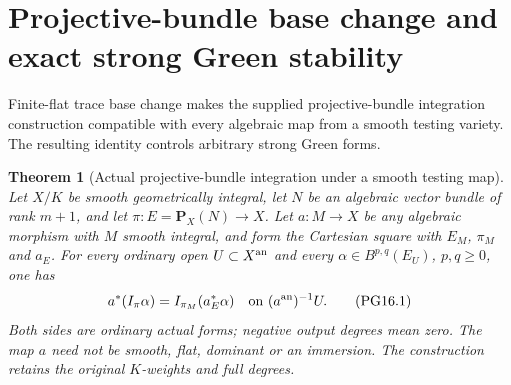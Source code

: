 \documentclass[11pt,a4paper]{article}
\newtheorem{theorem}{Theorem}[section]
\theoremstyle{definition}
\theoremstyle{remark}
\numberwithin{equation}{section}
\begin{document}
\section{Projective-bundle base change and exact strong Green stability}
\label{r16pg:section}

Finite-flat trace base change makes the supplied projective-bundle integration construction compatible with every algebraic map from a smooth testing variety. The resulting identity controls arbitrary strong Green forms.

\begin{theorem}[Actual projective-bundle integration under a smooth testing map]
\label{r16pg:base-change}
Let $X/K$ be smooth geometrically integral, let $N$ be an algebraic
vector bundle of rank $m+1$, and let $\pi:E=\mathbf P_X(N)\to X$.
Let $a:M\to X$ be any algebraic morphism with $M$ smooth integral,
and form the Cartesian square with $E_M$, $\pi_M$ and $a_E$.
For every ordinary open $U\subset X^{\rm an}$ and every
$\alpha\in B^{p,q}(E_U)$, $p,q\geq0$, one has
\[
 a^*(I_\pi\alpha)=I_{\pi_M}(a_E^*\alpha)
 \quad\text{on }(a^{\rm an})^{-1}U.
 \tag{PG16.1}\label{r16pg:bc}
\]
Both sides are ordinary actual forms; negative output degrees mean
zero. The map $a$ need not be smooth, flat, dominant or an immersion.
The construction retains the original $K$-weights and full degrees.
\end{theorem}
\end{document}
